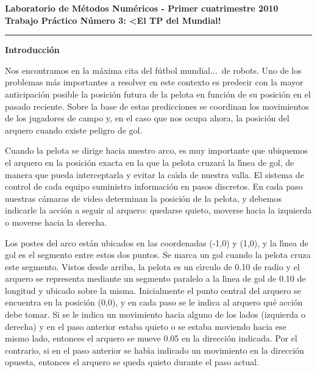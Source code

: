 \begin{centering}
\bf Laboratorio de M\'etodos Num\'ericos - Primer cuatrimestre 2010 \\
\bf Trabajo Pr\'actico N\'umero 3: <El TP del Mundial! \\
\end{centering}

\vskip 25pt
\hrule
\vskip 11pt

\textbf{Introducci\'on}

Nos encontramos en la m\'axima cita del f\'utbol mundial...~de robots.
Uno de los problemas m\'as importantes a resolver en este contexto es
predecir con la mayor anticipaci\'on posible la posici\'on futura de la 
pelota en funci\'on de su posici\'on en el pasado reciente. Sobre la base
de estas predicciones se coordinan los movimientos de los jugadores de
campo y, en el caso que nos ocupa ahora, la posici\'on del arquero cuando
existe peligro de gol.

Cuando la pelota se dirige hacia nuestro arco, es muy importante que
ubiquemos el arquero en la posici\'on exacta en la que la pelota 
cruzar\'a la l\'\i nea de gol, de manera que pueda interceptarla y evitar
la ca\'\i da de nuestra valla. El sistema de control de cada equipo
suministra informaci\'on en pasos discretos. En cada paso nuestras
c\'amaras de video determinan la posici\'on de la pelota, y debemos
indicarle la acci\'on a seguir al arquero: quedarse quieto, moverse 
hacia la izquierda o moverse hacia la derecha.

Los postes del arco est\'an ubicados en las coordenadas (-1,0) y (1,0),
y la l\'\i nea de gol es el segmento entre estos dos puntos. Se marca
un gol cuando la pelota cruza este segmento. Vistos desde arriba, la pelota
es un c\'\i rculo de 0.10 de radio y el arquero 
se representa mediante un segmento paralelo a la l\'\i nea de gol de 0.10 
de longitud y ubicado sobre la misma.
Inicialmente el punto central del arquero se encuentra en la
posici\'on (0,0), y en cada paso se le indica al arquero qu\'e acci\'on
debe tomar. Si se le indica un movimiento hacia alguno de los lados
(izquierda o derecha) y en el paso anterior estaba quieto o se estaba
moviendo hacia ese mismo lado, entonces el arquero se mueve 0.05 en
la direcci\'on indicada. Por el contrario, si en el paso anterior se
hab\'\i a indicado un movimiento en la direcci\'on opuesta, entonces
el arquero se queda quieto durante el paso actual.

